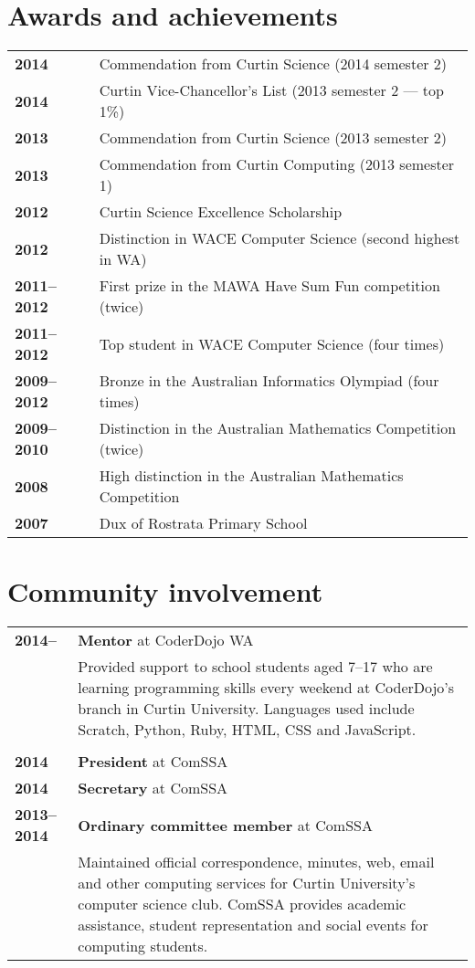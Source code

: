\documentclass[a4paper,12pt]{article}
\begin{document}
\section*{Awards and achievements}

\begin{tabular}{p{3.5cm}p{12.5cm}}
	\textbf{2014} &
		Commendation from Curtin Science (2014 semester 2)\\
	\textbf{2014} &
		Curtin Vice-Chancellor's List (2013 semester 2 --- top 1\%)\\
	\textbf{2013} &
		Commendation from Curtin Science (2013 semester 2)\\
	\textbf{2013} &
		Commendation from Curtin Computing (2013 semester 1)\\
	\textbf{2012} &
		Curtin Science Excellence Scholarship\\
	\textbf{2012} &
		Distinction in WACE Computer Science (second highest in WA)\\
	\textbf{2011--2012} &
		First prize in the MAWA Have Sum Fun competition (twice)\\
	\textbf{2011--2012} &
		Top student in WACE Computer Science (four times)\\
	\textbf{2009--2012} &
		Bronze in the Australian Informatics Olympiad (four times)\\
	\textbf{2009--2010} &
		Distinction in the Australian Mathematics Competition (twice)\\
	\textbf{2008} &
		High distinction in the Australian Mathematics Competition\\
	\textbf{2007} &
		Dux of Rostrata Primary School
\end{tabular}

\section*{Community involvement}

\begin{tabular}{p{3.5cm}p{12.5cm}}
	\textbf{2014--} &
		\textbf{Mentor} at CoderDojo WA\\ &
		Provided support to school students aged 7--17 who are
		learning programming skills every weekend at CoderDojo's
		branch in Curtin University. Languages used include
		Scratch, Python, Ruby, HTML, CSS and JavaScript.\\\\
	\textbf{2014} &
		\textbf{President} at ComSSA\\
	\textbf{2014} &
		\textbf{Secretary} at ComSSA\\
	\textbf{2013--2014} &
		\textbf{Ordinary committee member} at ComSSA\\ &
		Maintained official correspondence, minutes, web, email and
		other computing services for Curtin University's computer
		science club. ComSSA provides academic assistance, student
		representation and social events for computing students.
\end{tabular}
\end{document}

